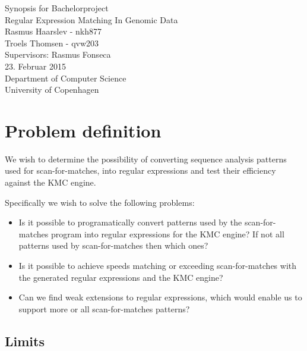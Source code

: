 \documentclass[12pt]{article}
\begin{document}
\begin{titlepage}
    \vspace*{\fill}
    \begin{center}
      {\Huge Synopsis for Bachelorproject}\\[0.7cm]
      {\Large Regular Expression Matching In Genomic Data}\\[0.4cm]
      {\large Rasmus Haarslev - nkh877}\\
      {\large Troels Thomsen - qvw203}\\[0.4cm]
      {Supervisors: Rasmus Fonseca}\\
      {\small 23. Februar 2015}\\[0.3cm] 
      {\small Department of Computer Science}\\
      {\small University of Copenhagen}
    \end{center}
    \vspace*{\fill}
\end{titlepage}	

\clearpage

\thispagestyle{empty}

\newpage

\section{Problem definition}

We wish to determine the possibility of converting sequence analysis patterns used for scan-for-matches\cite{scan-for-matches}, into regular expressions\cite{crash-course-regex} and test their efficiency against the KMC\cite{kmc-website} engine.

Specifically we wish to solve the following problems:

\begin{itemize}
	\item Is it possible to programatically convert patterns used by the scan-for-matches program into regular expressions for the KMC engine? If not all patterns used by scan-for-matches then which ones?
	\item Is it possible to achieve speeds matching or exceeding scan-for-matches with the generated regular expressions and the KMC engine?
	\item Can we find weak extensions to regular expressions, which would enable us to support more or all scan-for-matches patterns?
\end{itemize}

\subsection{Limits}
\end{document}
